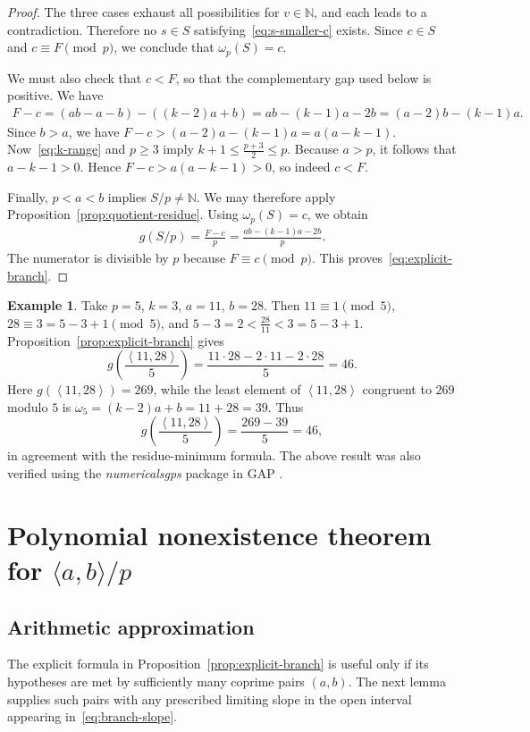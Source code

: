 \documentclass[reqno, 12pt]{article}
\numberwithin{equation}{section}
\theoremstyle{definition}
\newtheorem{example}[theorem]{Example}
\newcommand{\NN}{\mathbb{N}}
\newcommand{\gen}[1]{\left\langle #1\right\rangle}
\begin{document}
\begin{proof}
The three cases exhaust all possibilities for $v\in\NN$, and each leads to a
contradiction.  Therefore no $s\in S$ satisfying~\cref{eq:s-smaller-c}
exists.  Since $c\in S$ and $c\equiv F\pmod p$, we conclude that $\omega_p(S)=c$.

We must also check that $c<F$, so that the complementary gap used below is
positive.  We have
\begin{align*}
  F-c=(ab-a-b)-((k-2)a+b)=ab-(k-1)a-2b=(a-2)b-(k-1)a.
\end{align*}
Since $b>a$, we have $F-c>(a-2)a-(k-1)a=a(a-k-1)$.
Now~\cref{eq:k-range} and $p\ge3$ imply $k+1\le\frac{p+3}{2}\le p$.
Because $a>p$, it follows that $a-k-1>0$.  Hence $F-c>a(a-k-1)>0$, so indeed $c<F$.

Finally, $p<a<b$ implies $S/p\neq\NN$.  We may therefore apply
Proposition~\ref{prop:quotient-residue}.  Using
$\omega_p(S)=c$, we obtain
\begin{align*}
g(S/p)=\frac{F-c}{p}=\frac{ab-(k-1)a-2b}{p}.
\end{align*}
The numerator is divisible by $p$ because $F\equiv c\pmod p$. This proves~\cref{eq:explicit-branch}.
\end{proof}

\begin{example}\label{ex:branch}
Take $p=5$, $k=3$, $a=11$, $b=28$.
Then $11\equiv1\pmod5$, $28\equiv3=5-3+1\pmod5$, and $5-3=2<\frac{28}{11}<3=5-3+1$.
Proposition~\ref{prop:explicit-branch} gives
\[g\!\left(\frac{\gen{11,28}}{5}\right)=\frac{11\cdot28-2\cdot11-2\cdot28}{5}=46.
\]
Here $g(\gen{11,28})=269$, while the least element of
$\gen{11,28}$ congruent to $269$ modulo $5$ is $\omega_5=(k-2)a+b=11+28=39$.
Thus
\[g\!\left(\frac{\gen{11,28}}{5}\right)=\frac{269-39}{5}=46,
\]
in agreement with the residue-minimum formula.
The above result was also verified using the \emph{numericalsgps} package in GAP \cite{M.Delgado}.
\end{example}

\section{Polynomial nonexistence theorem for $\langle a,b\rangle/p$}\label{Section-Four-TheoI}

\subsection{Arithmetic approximation}

The explicit formula in Proposition~\ref{prop:explicit-branch} is useful only
if its hypotheses are met by sufficiently many coprime pairs $(a,b)$.  The
next lemma supplies such pairs with any prescribed limiting slope in the
open interval appearing in~\cref{eq:branch-slope}.
\end{document}

